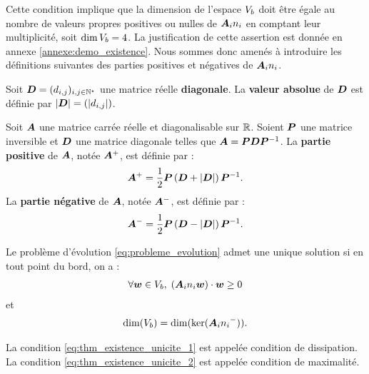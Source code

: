 Cette condition implique que la dimension de l’espace $V_b$
doit être égale au nombre de valeurs propres positives ou nulles de ${\bm{A}_{i}n_{i}}$ en
comptant leur multiplicité, soit $\dim V_b = 4$.
La justification de cette assertion est donnée en annexe \ref{annexe:demo_existence}.
Nous sommes donc amenés à introduire les définitions suivantes
des parties positives et négatives de ${\bm{A}_{i}n_{i}}$.

\begin{definition}
	Soit $\bm{D} = (d_{i,j})_{i,j \in \mathbb{N}^\star}$ une matrice réelle
	\textbf{diagonale}. La \textbf{valeur absolue} de $\bm{D}$ est définie par
	$\left\vert\bm{D}\right\vert = (\left\vert d_{i,j}\right\vert)$.
\end{definition}

\begin{definition} \label{def:matrix_pos_neg}
	Soit $\bm{A}$ une matrice carrée réelle et diagonalisable sur $\mathbb{R}$. Soient
	$\bm{P}$ une matrice inversible et $\bm{D}$ une matrice diagonale telles que
	$\bm{A} = \bm{P} \bm{D} \bm{P}^{-1}$.
	La \textbf{partie positive} de $\bm{A}$, notée $\bm{A}^{+}$, est définie par :
	\begin{align}
		\bm{A}^{+} = \frac{1}{2} \bm{P} \left( \bm{D} + \left\vert\bm{D}\right\vert \right) \bm{P}^{-1} .
	\end{align}
	La \textbf{partie négative} de $\bm{A}$, notée $\bm{A}^{-}$, est définie par :
	\begin{align}
		\bm{A}^{-} = \frac{1}{2} \bm{P} \left( \bm{D} - \left\vert\bm{D}\right\vert \right) \bm{P}^{-1} .
	\end{align}
\end{definition}


\begin{theorem} \label{thm:existence_unicite}
	Le problème d'évolution \eqref{eq:probleme_evolution} admet une
	unique solution si en tout point du bord, on a :
	\begin{align}
		\forall \bm{w} \in V_b, \; ({\bm{A}_{i}n_{i}} \bm{w}) \cdot \bm{w} \ge 0
		\label{eq:thm_existence_unicite_1}
	\end{align}
	et
	\begin{align}
		\dim(V_b) = \dim(\ker({\bm{A}_{i}n_{i}}^{-}))
		\label{eq:thm_existence_unicite_2} .
	\end{align}
\end{theorem}
La condition \eqref{eq:thm_existence_unicite_1} est appelée condition de dissipation.
La condition \eqref{eq:thm_existence_unicite_2} est appelée condition de maximalité.
\\



